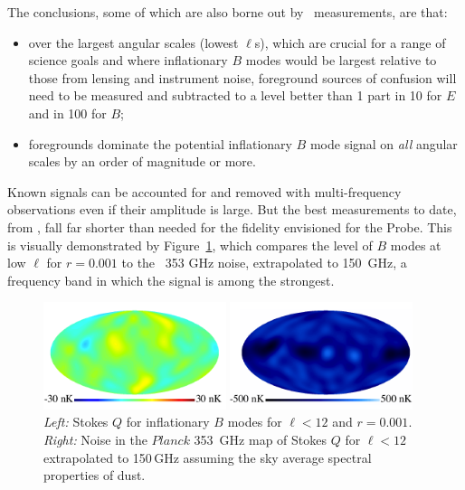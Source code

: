 \noindent The conclusions, some of which are also borne out by \planck\ measurements, are that: 
\begin{itemize}
\item{over the largest angular scales (lowest $\ell$s), which are crucial for a range 
of science goals and where inflationary $B$ modes 
would be largest relative to those from lensing and instrument noise, foreground sources of confusion will need to be measured and subtracted to a level better than 1 part in 10 for $E$ and in 100 for $B$;}
\item{foregrounds dominate the potential inflationary $B$ mode signal on {\it all} angular scales by an order of magnitude or more.}
\end{itemize}

Known signals can be accounted for and removed with multi-frequency observations even if their amplitude is large. 
But the best measurements to date, from \planck , fall far shorter than needed for the fidelity 
envisioned for the Probe. This is visually demonstrated by Figure~\ref{fig:Qrp001}, which 
compares the level of $B$ modes at low $\ell$ for $r = 0.001$ to the \planck\ 353 GHz noise, 
extrapolated to 150~GHz, a frequency band in which the signal is among the strongest. 
\begin{figure}[ht!]
\hspace{.05in}
\parbox{2.in}{\centerline {
\includegraphics[width=2.1in]{Figures/P15_2_12_rp001.pdf} } }
\parbox{2.1in}{\centerline { 
\includegraphics[width=2.1in]{Figures/P353_N_2_12.pdf} } }
\hspace{0.in}
\parbox{2.2in} { 
\caption{ \footnotesize \setlength{\baselineskip}{0.95\baselineskip}
{\it Left:} Stokes $Q$ for inflationary $B$ modes for $\ell<12$ and $r=0.001$. 
 {\it Right:} Noise in the $Planck$ 353~GHz map of Stokes $Q$ for $\ell<12$ 
 extrapolated to 150\,GHz assuming the sky average spectral properties of dust. 
\label{fig:Qrp001}  }  }
\vspace{-0.05in}
\end{figure}

